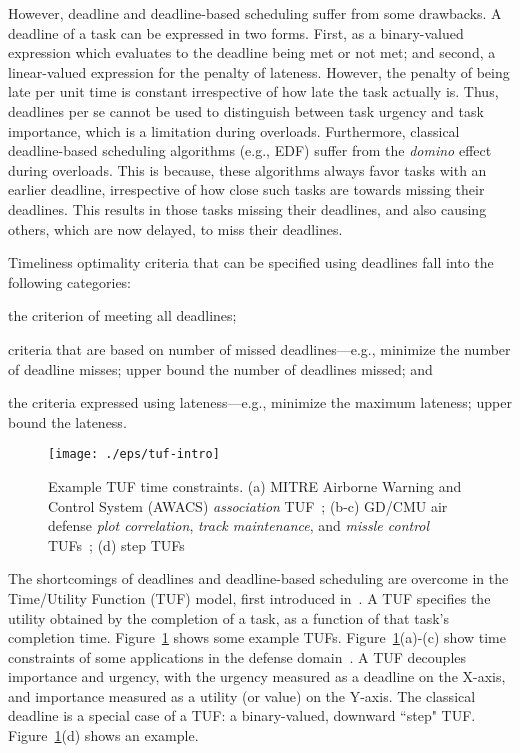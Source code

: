 \documentclass[12pt,dvips]{report}
\begin{document}
However, deadline and deadline-based scheduling suffer from some drawbacks. A deadline of a task can be expressed in two forms. First, as a binary-valued expression which evaluates to the deadline being met or not met; and second, a linear-valued expression for the penalty of lateness. However, the penalty of being late per unit time is constant irrespective of how late the task actually is. Thus, deadlines per se cannot be used to distinguish between task urgency and task importance, which is a limitation during overloads.  Furthermore, classical deadline-based scheduling algorithms (e.g., EDF) suffer from the \textit{domino} effect~\cite{loc86} during overloads. This is because, these algorithms always favor tasks with an earlier deadline, irrespective of how close such tasks are towards missing their deadlines. This results in those tasks missing their deadlines, and also causing others, which are now delayed, to miss their deadlines. 

Timeliness optimality criteria that can be specified using deadlines fall into the following categories:
\begin{inparaenum}[(i)]
\item the criterion of meeting all deadlines;
\item criteria that are based on number of missed deadlines---e.g., minimize the number of deadline misses; upper bound the number of deadlines missed; and
\item the criteria expressed using lateness---e.g., minimize the maximum lateness; upper bound the lateness.
\end{inparaenum} 

\begin{figure} [htbp]
  \centering
  \texttt{[image: ./eps/tuf-intro]}
  \caption{Example TUF time constraints. (a) MITRE Airborne Warning and Control System (AWACS) \textit{association} TUF~\cite{Clark_anadaptive};
	(b-c) GD/CMU air defense \textit{plot correlation}, \textit{track maintenance}, and \textit{missle control} TUFs~\cite{archons88}; 
	(d) step TUFs}
  \label{fig:tuf-intro}
\end{figure}

The shortcomings of deadlines and deadline-based scheduling are overcome in the Time/Utility Function (TUF) model, first introduced in~\cite{TUFjensen85time}. A TUF specifies the utility obtained by the completion of a task, as a function of that task's completion time. Figure~\ref{fig:tuf-intro} shows some example TUFs. Figure~\ref{fig:tuf-intro}(a)-(c) show time constraints of some applications in the defense domain~\cite{Clark_anadaptive,archons88}. A TUF decouples importance and urgency, with the urgency measured as a deadline on the X-axis, and importance measured as a utility (or value) on the Y-axis.  The classical deadline is a special case of a TUF: a binary-valued, downward ``step" TUF. Figure~\ref{fig:tuf-intro}(d) shows an example. 
\end{document}
